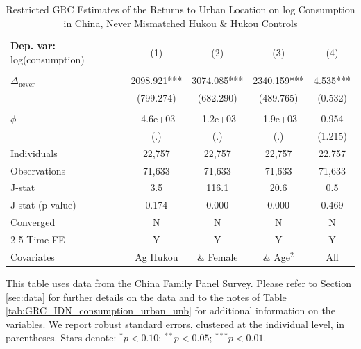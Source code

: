 \begin{table}[htbp] \centering \begin{threeparttable}
 \caption{Restricted GRC Estimates of the Returns to Urban Location on log Consumption in China, Never Mismatched Hukou & Hukou Controls} 
 \label{tab:GRC_CHN_nm_hctrl_consumption_urban_unb} 
\begin{tabular}{l cccc} \toprule  \textbf{Dep. var:}  log(consumption) 
                    &\multicolumn{1}{c}{(1)}   &\multicolumn{1}{c}{(2)}   &\multicolumn{1}{c}{(3)}   &\multicolumn{1}{c}{(4)}   \\
                    &               &               &               &               \\
\addlinespace
$\Delta_{\text{never}}$&    2098.921***&    3074.085***&    2340.159***&       4.535***\\
                    &   (799.274)   &   (682.290)   &   (489.765)   &     (0.532)   \\
                    &               &               &               &               \\
\addlinespace
$\phi$              &    -4.6e+03   &    -1.2e+03   &    -1.9e+03   &       0.954   \\
                    &         (.)   &         (.)   &         (.)   &     (1.215)   \\
\addlinespace
Individuals         &      22,757   &      22,757   &      22,757   &      22,757   \\
Observations        &      71,633   &      71,633   &      71,633   &      71,633   \\
J-stat              &         3.5   &       116.1   &        20.6   &         0.5   \\
J-stat (p-value)    &       0.174   &       0.000   &       0.000   &       0.469   \\
Converged           &           N   &           N   &           N   &           N   \\
\cmidrule{2-5} Time FE & Y & Y & Y & Y \\ Covariates & Ag Hukou & \& Female & \& Age$^2$ & All \\ \bottomrule \end{tabular} \begin{tablenotes}[flushleft] \footnotesize \item{This table uses data from the China Family Panel Survey. Please refer to Section \ref{sec:data} for further details on the data and to the notes of Table \ref{tab:GRC_IDN_consumption_urban_unb} for additional information on the variables. We report robust standard errors, clustered at the individual level, in parentheses. Stars denote: $^{*} p<0.10$; $^{**} p<0.05$; $^{***} p<0.01$.} \end{tablenotes} \end{threeparttable} \end{table}
